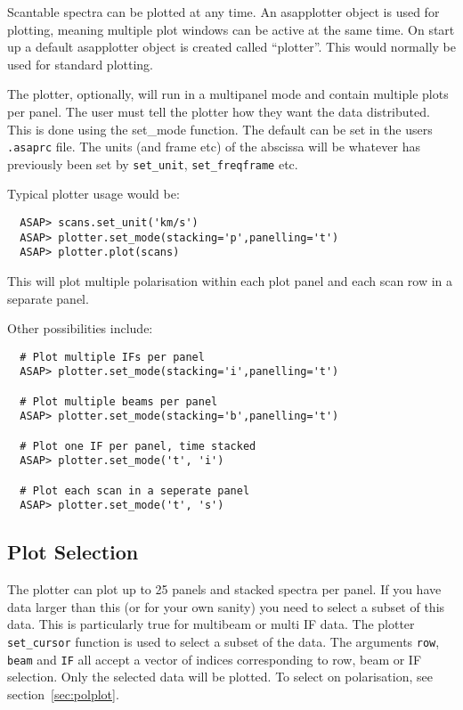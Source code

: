 \documentclass[11pt]{article}
\newcommand{\cmd}[1]{{\tt #1}}
\begin{document}
Scantable spectra can be plotted at any time. An asapplotter object is
used for plotting, meaning multiple plot windows can be active at the
same time. On start up a default asapplotter object is created called
``plotter''. This would normally be used for standard plotting.

The plotter, optionally, will run in a multipanel mode and contain
multiple plots per panel. The user must tell the plotter how they want
the data distributed. This is done using the set\_mode function. The
default can be set in the users {\tt .asaprc} file. The units (and frame
etc) of the abscissa will be whatever has previously been set by
\cmd{set\_unit}, \cmd{set\_freqframe} etc.

Typical plotter usage would be:

\begin{verbatim}
  ASAP> scans.set_unit('km/s')
  ASAP> plotter.set_mode(stacking='p',panelling='t')
  ASAP> plotter.plot(scans)
\end{verbatim}

This will plot multiple polarisation within each plot panel and each
scan row in a separate panel.

Other possibilities include:

\begin{verbatim}
  # Plot multiple IFs per panel
  ASAP> plotter.set_mode(stacking='i',panelling='t')

  # Plot multiple beams per panel
  ASAP> plotter.set_mode(stacking='b',panelling='t')

  # Plot one IF per panel, time stacked
  ASAP> plotter.set_mode('t', 'i')

  # Plot each scan in a seperate panel
  ASAP> plotter.set_mode('t', 's')

\end{verbatim}

\subsection{Plot Selection}
\label{sec:plotter_cursor}

The plotter can plot up to 25 panels and
stacked spectra per panel. If you have data larger than this (or for
your own sanity) you need to select a subset of this data. This is
particularly true for multibeam or multi IF data. The plotter
\cmd{set\_cursor} function is used to select a subset of the data. The
arguments \cmd{row}, \cmd{beam} and \cmd{IF} all accept a vector of
indices corresponding to row, beam or IF selection. Only the selected
data will be plotted.  To select on polarisation, see
section~\ref{sec:polplot}.
\end{document}
